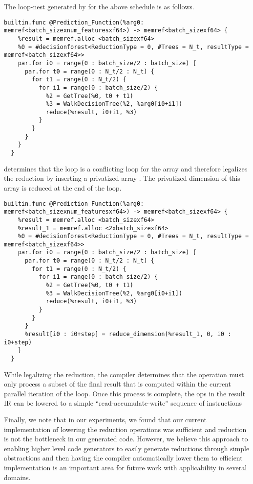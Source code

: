 The loop-nest generated by \Treebeard{} for the above schedule is as follows. 
\begin{lstlisting}[style=c++]
  builtin.func @Prediction_Function(%arg0: memref<batch_sizexnum_featuresxf64>) -> memref<batch_sizexf64> {
    %result = memref.alloc <batch_sizexf64>
    %0 = #decisionforest<ReductionType = 0, #Trees = N_t, resultType = memref<batch_sizexf64>> 
    par.for i0 = range(0 : batch_size/2 : batch_size) {
      par.for t0 = range(0 : N_t/2 : N_t) {
        for t1 = range(0 : N_t/2) {
          for i1 = range(0 : batch_size/2) {
            %2 = GetTree(%0, t0 + t1) 
            %3 = WalkDecisionTree(%2, %arg0[i0+i1])
            reduce(%result, i0+i1, %3)
          }
        }
      }
    }
  }
\end{lstlisting}

\Treebeard{} determines that the  loop is a conflicting loop for the 
array and therefore legalizes the reduction by inserting a privatized array 
. The privatized dimension of this array is reduced at the end 
of the  loop.

\begin{lstlisting}[style=c++]
  builtin.func @Prediction_Function(%arg0: memref<batch_sizexnum_featuresxf64>) -> memref<batch_sizexf64> {
    %result = memref.alloc <batch_sizexf64>
    %result_1 = memref.alloc <2xbatch_sizexf64>
    %0 = #decisionforest<ReductionType = 0, #Trees = N_t, resultType = memref<batch_sizexf64>> 
    par.for i0 = range(0 : batch_size/2 : batch_size) {
      par.for t0 = range(0 : N_t/2 : N_t) {
        for t1 = range(0 : N_t/2) {
          for i1 = range(0 : batch_size/2) {
            %2 = GetTree(%0, t0 + t1) 
            %3 = WalkDecisionTree(%2, %arg0[i0+i1])
            reduce(%result, i0+i1, %3)
          }
        }
      }
      %result[i0 : i0+step] = reduce_dimension(%result_1, 0, i0 : i0+step)
    }
  }
\end{lstlisting}

While legalizing the reduction, the compiler determines that the 
 operation must only process a subset of the final 
result that is computed within the current parallel iteration of the 
 loop. Once this process is complete, the  ops in 
the result IR can be lowered to a simple ``read-accumulate-write''
sequence of instructions

Finally, we note that in our experiments, we found that our 
current implementation of lowering the reduction operations 
was sufficient and reduction is not the bottleneck in our 
generated code. However, we believe this approach to enabling 
higher level code generators to easily generate reductions 
through simple abstractions and then having the compiler 
automatically lower them to efficient implementation is an
important area for future work with applicability in several 
domains. 

